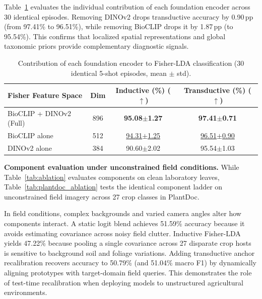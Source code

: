 \documentclass[preprint,12pt]{elsarticle}
\begin{document}
Table~\ref{tab:feature_ablation} evaluates the individual contribution of each foundation encoder across 30 identical episodes. Removing DINOv2 drops transductive accuracy by 0.90\,pp (from 97.41\% to 96.51\%), while removing BioCLIP drops it by 1.87\,pp (to 95.54\%). This confirms that localized spatial representations and global taxonomic priors provide complementary diagnostic signals.

\begin{table}[htbp]
\caption{Contribution of each foundation encoder to Fisher-LDA classification (30 identical 5-shot episodes, mean $\pm$ std).}
\label{tab:feature_ablation}
\centering

\footnotesize
\setlength{\tabcolsep}{4pt}
\begin{tabular*}{\columnwidth}{@{\extracolsep{\fill}}lccc}
\toprule
\textbf{Fisher Feature Space} & \textbf{Dim} & \textbf{Inductive (\%) ($\uparrow$)} & \textbf{Transductive (\%) ($\uparrow$)} \\
\midrule
BioCLIP + DINOv2 (Full) & 896 & \textbf{95.08$\pm$1.27} & \textbf{97.41$\pm$0.71} \\
BioCLIP alone & 512 & \underline{94.31$\pm$1.25} & \underline{96.51$\pm$0.90} \\
DINOv2 alone & 384 & 90.60$\pm$2.02 & 95.54$\pm$1.03 \\
\bottomrule
\end{tabular*}
\end{table}

\textbf{Component evaluation under unconstrained field conditions.} While Table~\ref{tab:ablation} evaluates components on clean laboratory leaves, Table~\ref{tab:plantdoc_ablation} tests the identical component ladder on unconstrained field imagery across 27 crop classes in PlantDoc.

In field conditions, complex backgrounds and varied camera angles alter how components interact. A static logit blend achieves 51.59\% accuracy because it avoids estimating covariance across noisy field clutter. Inductive Fisher-LDA yields 47.22\% because pooling a single covariance across 27 disparate crop hosts is sensitive to background soil and foliage variations. Adding transductive anchor recalibration recovers accuracy to 50.79\% (and 51.04\% macro F1) by dynamically aligning prototypes with target-domain field queries. This demonstrates the role of test-time recalibration when deploying models to unstructured agricultural environments.
\end{document}
